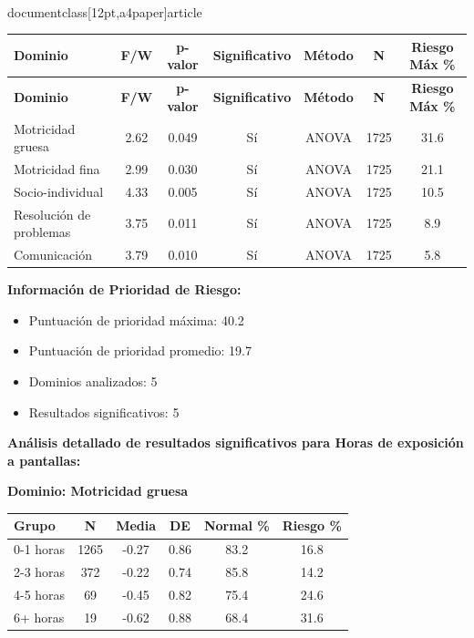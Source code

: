 \\documentclass[12pt,a4paper]{article}
\begin{document}
\begin{longtable}{|l|c|c|c|c|c|c|}
\hline
\textbf{Dominio} & \textbf{F/W} & \textbf{p-valor} & \textbf{Significativo} & \textbf{Método} & \textbf{N} & \textbf{Riesgo Máx \%} \\
\hline
\endfirsthead

\hline
\textbf{Dominio} & \textbf{F/W} & \textbf{p-valor} & \textbf{Significativo} & \textbf{Método} & \textbf{N} & \textbf{Riesgo Máx \%} \\
\hline
\endhead

\hline
\endfoot

\hline
\endlastfoot

Motricidad gruesa & 2.62 & 0.049 & Sí & ANOVA & 1725 & 31.6 \\
Motricidad fina & 2.99 & 0.030 & Sí & ANOVA & 1725 & 21.1 \\
Socio-individual & 4.33 & 0.005 & Sí & ANOVA & 1725 & 10.5 \\
Resolución de problemas & 3.75 & 0.011 & Sí & ANOVA & 1725 & 8.9 \\
Comunicación & 3.79 & 0.010 & Sí & ANOVA & 1725 & 5.8 \\

\end{longtable}


\textbf{Información de Prioridad de Riesgo:}
\begin{itemize}
\item Puntuación de prioridad máxima: 40.2
\item Puntuación de prioridad promedio: 19.7
\item Dominios analizados: 5
\item Resultados significativos: 5
\end{itemize}


\textbf{Análisis detallado de resultados significativos para Horas de exposición a pantallas:}


\textbf{Dominio: Motricidad gruesa}


\begin{center}
\begin{tabular}{|l|c|c|c|c|c|}
\hline
\textbf{Grupo} & \textbf{N} & \textbf{Media} & \textbf{DE} & \textbf{Normal \%} & \textbf{Riesgo \%} \\
\hline
0-1 horas & 1265 & -0.27 & 0.86 & 83.2 & 16.8 \\
2-3 horas & 372 & -0.22 & 0.74 & 85.8 & 14.2 \\
4-5 horas & 69 & -0.45 & 0.82 & 75.4 & 24.6 \\
6+ horas & 19 & -0.62 & 0.88 & 68.4 & 31.6 \\

\hline
\end{tabular}
\end{center}
\end{document}
